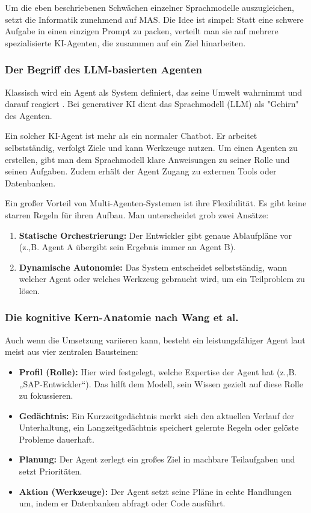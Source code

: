 Um die eben beschriebenen Schwächen einzelner Sprachmodelle auszugleichen, setzt die Informatik zunehmend auf \ac{MAS}. Die Idee ist simpel: Statt eine schwere Aufgabe in einen einzigen Prompt zu packen, verteilt man sie auf mehrere spezialisierte KI-Agenten, die zusammen auf ein Ziel hinarbeiten.

\subsubsection{Der Begriff des LLM-basierten Agenten}
Klassisch wird ein Agent als System definiert, das seine Umwelt wahrnimmt und darauf reagiert \parencite[S. 36]{russellArtificialIntelligenceModern2010}. Bei generativer \ac{KI} dient das Sprachmodell (LLM) als "Gehirn" des Agenten.

Ein solcher KI-Agent ist mehr als ein normaler Chatbot. Er arbeitet selbstständig, verfolgt Ziele und kann Werkzeuge nutzen. Um einen Agenten zu erstellen, gibt man dem Sprachmodell klare Anweisungen zu seiner Rolle und seinen Aufgaben. Zudem erhält der Agent Zugang zu externen Tools oder Datenbanken.

Ein großer Vorteil von Multi-Agenten-Systemen ist ihre Flexibilität. Es gibt keine starren Regeln für ihren Aufbau. Man unterscheidet grob zwei Ansätze:
\begin{enumerate}
\item \textbf{Statische Orchestrierung:} Der Entwickler gibt genaue Ablaufpläne vor (z.,B. Agent A übergibt sein Ergebnis immer an Agent B).
\item \textbf{Dynamische Autonomie:} Das System entscheidet selbstständig, wann welcher Agent oder welches Werkzeug gebraucht wird, um ein Teilproblem zu lösen.
\end{enumerate}

\subsubsection{Die kognitive Kern-Anatomie nach Wang et al.}
Auch wenn die Umsetzung variieren kann, besteht ein leistungsfähiger Agent laut \textcite{wangSurveyLargeLanguage2024} meist aus vier zentralen Bausteinen:

\begin{itemize}
\item \textbf{Profil (Rolle):} Hier wird festgelegt, welche Expertise der Agent hat (z.,B. „SAP-Entwickler“). Das hilft dem Modell, sein Wissen gezielt auf diese Rolle zu fokussieren.
\item \textbf{Gedächtnis:} Ein Kurzzeitgedächtnis merkt sich den aktuellen Verlauf der Unterhaltung, ein Langzeitgedächtnis speichert gelernte Regeln oder gelöste Probleme dauerhaft.
\item \textbf{Planung:} Der Agent zerlegt ein großes Ziel in machbare Teilaufgaben und setzt Prioritäten.
\item \textbf{Aktion (Werkzeuge):} Der Agent setzt seine Pläne in echte Handlungen um, indem er Datenbanken abfragt oder Code ausführt.
\end{itemize}

